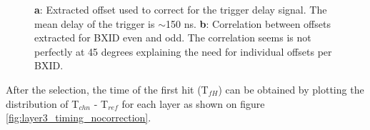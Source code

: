 \documentclass[twoside,a4paper,11pt]{article}
\begin{document}
\begin{figure}[htbp]
	\hfill
	\hfill
	\caption[]{\textbf{a}: Extracted offset used to correct for the trigger delay signal. The mean delay of the trigger is $\sim$150 ns. \textbf{b}: Correlation between offsets extracted for BXID even and odd. The correlation seems is not perfectly at 45 degrees explaining the need for individual offsets per BXID.}
\end{figure}
After the selection, the time of the first hit (T$_{fH}$) can be obtained by plotting the distribution of T$_{chn}$ - T$_{ref}$ for each layer as shown on figure \ref{fig:layer3_timing_nocorrection}.
\end{document}
